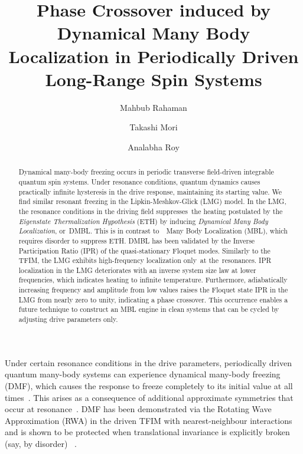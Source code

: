 \documentclass[%
reprint,
superscriptaddress,
amsmath,amssymb,
aps,
prb,
showkeys,
]{revtex4-2}
\begin{document}
	
	
	\title{Phase Crossover induced by Dynamical Many Body Localization in Periodically Driven Long-Range Spin Systems}
	
	\author{Mahbub Rahaman}
	\author{Takashi Mori}
	\author{Analabha Roy}
	
	
	\begin{abstract}
		Dynamical many-body freezing occurs in periodic transverse field-driven integrable quantum spin systems. Under resonance conditions, quantum dynamics causes practically infinite hysteresis in the drive response, maintaining its starting value. We find similar resonant freezing in the Lipkin-Meshkov-Glick (LMG) model. In the LMG, the resonance conditions in the driving field suppresses the heating postulated by the \textit{Eigenstate Thermalization Hypothesis} (ETH)		
		by inducing \textit{Dynamical Many Body Localization}, or DMBL. This is in contrast to  Many Body Localization (MBL), which requires disorder to suppress ETH. DMBL has been validated by the Inverse Participation Ratio (IPR) of the quasi-stationary Floquet modes. Similarly to the TFIM, the LMG exhibits high-frequency localization only at the resonances. IPR localization in the LMG deteriorates with an inverse system size law at lower frequencies, which indicates heating to infinite temperature. Furthermore, adiabatically increasing frequency and amplitude from low values raises the Floquet state IPR in the LMG from nearly zero to unity, indicating a phase crossover. This occurrence enables a future technique to construct an MBL engine in clean systems that can be cycled by adjusting drive parameters only.
	\end{abstract}
	
	\maketitle
	
	Under certain resonance conditions in the drive parameters, periodically driven quantum many-body systems can experience dynamical many-body freezing (DMF), which causes the response to freeze completely to its initial value at all times~\cite{bordia_periodically_2017, sahoo_periodically_2019, das_exotic_2010}. This arises as a consequence of additional approximate symmetries that occur at resonance~\cite{asmi:scars}. DMF has been demonstrated via the Rotating Wave Approximation (RWA) in the driven TFIM with nearest-neighbour interactions ~\cite{mbeng_quantum_2020} and is shown to be protected when translational invariance is explicitly broken (say, by disorder) ~\cite{yamada_localization_2022, roy_fate_2015}. 
	
\end{document}
